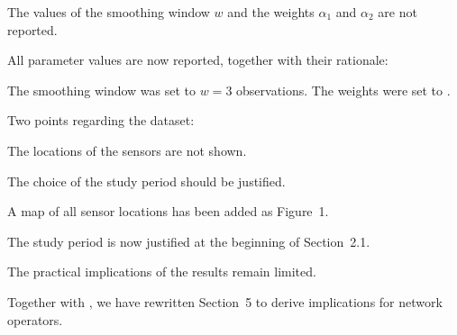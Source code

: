 \documentclass[11pt,english]{authorresponseletter}
\begin{document}
\begin{revcomment}
\label{r1:c1}
The values of the smoothing window $w$ and the weights $\alpha_1$ and $\alpha_2$ are not reported.
\end{revcomment}
\begin{revresponse}
All parameter values are now reported, together with their rationale:
\begin{revision}[Section 2.3, p.~6, ll.~110--118]
The smoothing window was set to $w = 3$ observations. The weights were set to .  
\end{revision}
\end{revresponse}

\begin{revcomment}
\label{r1:c2}
Two points regarding the dataset:
\begin{subcomments}
\item \label{r1:c2a} The locations of the sensors are not shown.
\item \label{r1:c2b} The choice of the study period should be justified.
\end{subcomments}
\end{revcomment}
\begin{revresponse}
\begin{subresponses}
\item A map of all sensor locations has been added as Figure~1.
\item The study period is now justified at the beginning of Section~2.1.
\end{subresponses}
\end{revresponse}

\begin{revcomment}
\label{r1:c3}
The practical implications of the results remain limited.
\end{revcomment}
\begin{revresponse}
Together with , we have rewritten Section~5 to derive implications for network operators.
\end{revresponse}
\end{document}
